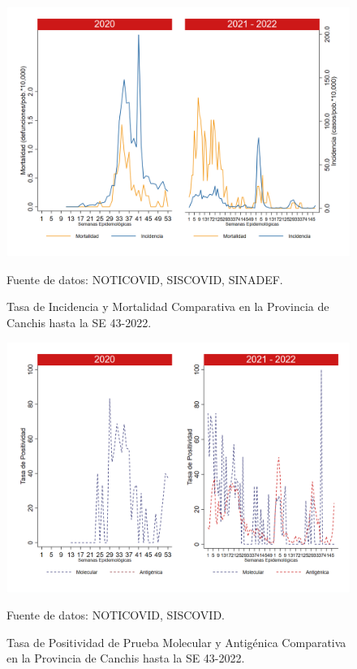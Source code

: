 \documentclass[12pt,a4paper,openany]{book}
\begin{document}
	\begin{figure}[h]
		\caption{Tasa de Incidencia y Mortalidad Comparativa en la Provincia de Canchis hasta la SE 43-2022.}\label{fig:inc_mort_canchis}
		\begin{center}
			\includegraphics[width=0.85\linewidth]{../figuras/incidencia_mortalidad_20_21_5.png}
		\end{center}
		{\footnotesize {Fuente de datos: NOTICOVID, SISCOVID, SINADEF.}}
	\end{figure}
	
	\begin{figure}[h]
		\caption{Tasa de Positividad de Prueba Molecular y Antigénica Comparativa en la Provincia de Canchis hasta la SE 43-2022.}\label{fig:positividad_canchis}
		\begin{center}
			\includegraphics[width=0.7\linewidth]{../figuras/positividad_20_21_5.png}
		\end{center}
		{\footnotesize {Fuente de datos: NOTICOVID, SISCOVID.}}
	\end{figure}
	
\end{document}
